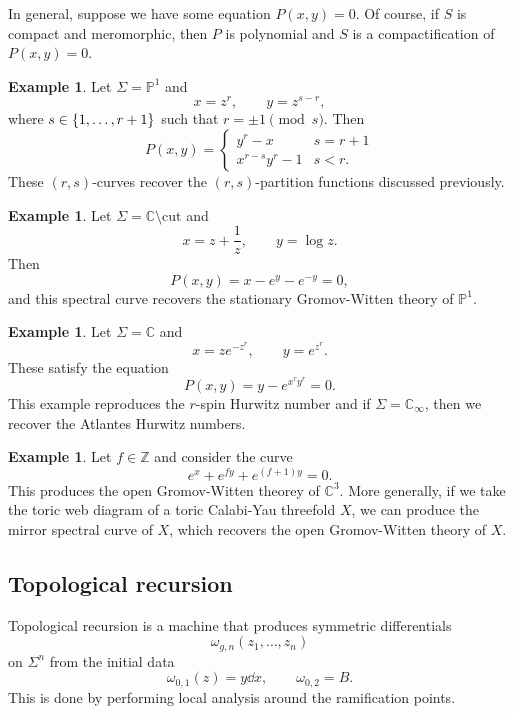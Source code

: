 \documentclass[leqno, openany]{memoir}
\theoremstyle{definition}
\newtheorem{exm}[thm]{Example}
\theoremstyle{remark}
\theoremstyle{plain}
\theoremstyle{definition}
\theoremstyle{remark}
\newcommand{\C}{\mathbb{C}}
\newcommand{\Z}{\mathbb{Z}}
\renewcommand{\P}{\mathbb{P}}
\newcommand{\mr}[1]{\mathrm{#1}}
\begin{document}
In general, suppose we have some equation $P(x,y) = 0$. Of course, if $S$ is compact and meromorphic, then $P$ is polynomial and $S$ is a compactification of $P(x,y) = 0$.

\begin{exm}
    Let $\Sigma = \P^1$ and 
    \[ x = z^r, \qquad y = z^{s-r}, \]
    where $s \in \qty{1, \ldots, r+1}$ such that $r = \pm 1 \pmod s$. Then
    \[ P(x,y) = \begin{cases}
        y^r-x & s = r+1 \\
        x^{r-s}y^r - 1 & s < r.
    \end{cases}
    \]
    These $(r,s)$-curves recover the $(r,s)$-partition functions discussed previously.
\end{exm}

\begin{exm}
    Let $\Sigma = \C \setminus \mr{cut}$ and
    \[ x = z + \frac{1}{z}, \qquad y = \log z. \]
    Then 
    \[ P(x,y) = x - e^y - e^{-y} = 0, \]
    and this spectral curve recovers the stationary Gromov-Witten theory of $\P^1$.
\end{exm}

\begin{exm}
    Let $\Sigma = \C$ and
    \[ x = ze^{-z^r}, \qquad y = e^{z^r}. \]
    These satisfy the equation
    \[ P(x,y) = y-e^{x^r y^r} = 0. \]
    This example reproduces the $r$-spin Hurwitz number and if $\Sigma = \C_{\infty}$, then we recover the Atlantes Hurwitz numbers.
\end{exm}

\begin{exm}
    Let $f \in \Z$ and consider the curve
    \[ e^x + e^{fy} + e^{(f+1)y} = 0. \]
    This produces the open Gromov-Witten theorey of $\C^3$. More generally, if we take the toric web diagram of a toric Calabi-Yau threefold $X$, we can produce the mirror spectral curve of $X$, which recovers the open Gromov-Witten theory of $X$.
\end{exm}

\subsection{Topological recursion}

Topological recursion is a machine that produces symmetric differentials
\[ \omega_{g,n}(z_1, \ldots, z_n) \]
on $\Sigma^n$ from the initial data
\[ \omega_{0,1}(z) = y \dd{x}, \qquad \omega_{0,2} = B. \]
This is done by performing local analysis around the ramification points.
\end{document}
